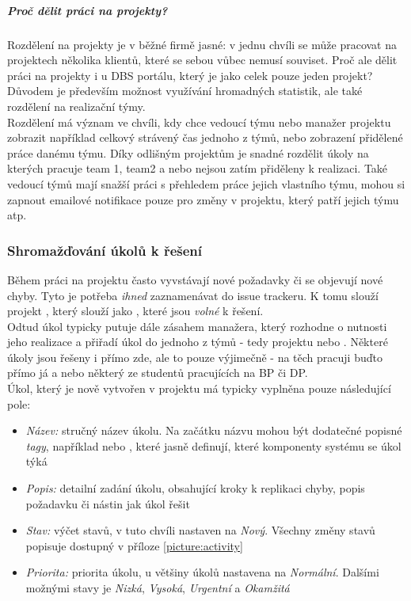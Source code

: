 \subparagraph{Proč dělit práci na projekty?}
Rozdělení na projekty je v běžné firmě jasné: v jednu chvíli se může pracovat na projektech několika klientů, které se sebou vůbec nemusí souviset. Proč ale dělit práci na projekty i u DBS portálu, který je jako celek pouze jeden projekt? Důvodem je především možnost využívání hromadných statistik, ale také rozdělení na realizační týmy.\\
Rozdělení má význam ve chvíli, kdy chce vedoucí týmu nebo manažer projektu zobrazit například celkový strávený čas jednoho z týmů, nebo zobrazení přidělené práce danému týmu. Díky odlišným projektům je snadné rozdělit úkoly na kterých pracuje team 1, team2 a nebo nejsou zatím přiděleny k realizaci. Také vedoucí týmů mají snažší práci s přehledem práce jejich vlastního týmu, mohou si zapnout emailové notifikace pouze pro změny v projektu, který patří jejich týmu atp.

\subsubsection{Shromažďování úkolů k řešení}

Během práci na projektu často vyvstávají nové požadavky či se objevují nové chyby. Tyto je potřeba \emph{ihned} zaznamenávat do issue trackeru. K tomu slouží projekt , který slouží jako , které jsou \emph{volné} k řešení.\\
Odtud úkol typicky putuje dále zásahem manažera, který rozhodne o nutnosti jeho realizace a přiřadí úkol do jednoho z týmů - tedy projektu  nebo . Některé úkoly jsou řešeny i přímo zde, ale to pouze výjimečně - na těch pracuji buďto přímo já a nebo některý ze studentů pracujících na BP či DP.\\
Úkol, který je nově vytvořen v  projektu má typicky vyplněna pouze následující pole:
\begin{itemize}
	\item \emph{Název:} stručný název úkolu. Na začátku názvu mohou být dodatečné popisné \emph{tagy}, například \code{[databaze]} nebo \code{[menu]}, které jasně definují, které komponenty systému se úkol týká
	\item \emph{Popis:} detailní zadání úkolu, obsahující kroky k replikaci chyby, popis požadavku či nástin jak úkol řešit
	\item \emph{Stav:} výčet stavů, v tuto chvíli nastaven na \emph{Nový}. Všechny změny stavů popisuje  dostupný v příloze \ref{picture:activity}
	\item \emph{Priorita:} priorita úkolu, u většiny úkolů nastavena na \emph{Normální}. Dalšími možnými stavy je \emph{Nizká}, \emph{Vysoká}, \emph{Urgentní} a \emph{Okamžitá}
\end{itemize}

